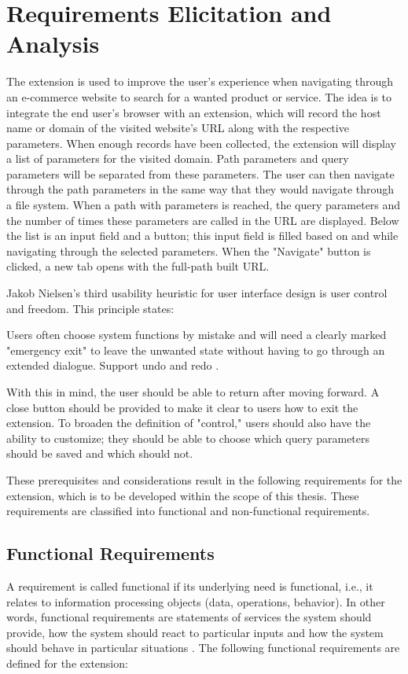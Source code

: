 \section{Requirements Elicitation and Analysis}
\label{requirements_analysis}
The extension is used to improve the user's experience when navigating through an e-commerce website to search for a wanted product or service. The idea is to integrate the end user's browser with an extension, which will record the host name or domain of the visited website's URL along with the respective parameters. When enough records have been collected, the extension will display a list of parameters for the visited domain. Path parameters and query parameters will be separated from these parameters. The user can then navigate through the path parameters in the same way that they would navigate through a file system. When a path with parameters is reached, the query parameters and the number of times these parameters are called in the URL are displayed. Below the list is an input field and a button; this input field is filled based on and while navigating through the selected parameters. When the "Navigate" button is clicked, a new tab opens with the full-path built URL.

Jakob Nielsen's third usability heuristic for user interface design is user control and freedom. This principle states:

\begin{displayquote}
  Users often choose system functions by mistake and will need a clearly marked "emergency exit" to leave the unwanted state without having to go through an extended dialogue. Support undo and redo \autocite{nielsen1994usability}.
\end{displayquote}

\noindent With this in mind, the user should be able to return after moving forward. A close button should be provided to make it clear to users how to exit the extension. To broaden the definition of "control," users should also have the ability to customize; they should be able to choose which query parameters should be saved and which should not.

These prerequisites and considerations result in the following requirements for the extension, which is to be developed within the scope of this thesis. These requirements are classified into functional and non-functional requirements.

\subsection{Functional Requirements}
A requirement is called functional if its underlying need is functional, i.e., it relates to information processing objects (data, operations, behavior). In other words, functional requirements are statements of services the system should provide, how the system should react to particular inputs and how the system should behave in particular situations \autocite{sommerville2011software}. The following functional requirements are defined for the extension:


